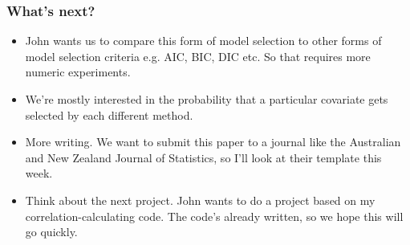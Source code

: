 \documentclass{beamer}
\begin{document}
\begin{frame}[t]\frametitle{What's next?}
	    
	\begin{itemize}
		\item John wants us to compare this form of model selection to other forms of model selection criteria e.g.
		      AIC, BIC, DIC etc. So that requires more numeric experiments.
		\item We're mostly interested in the probability that a particular covariate gets selected by each different method.
		\item More writing. We want to submit this paper to a journal like the Australian and New Zealand Journal of
		      Statistics, so I'll look at their template this week.
		\item Think about the next project. John wants to do a project based on my correlation-calculating code. The
		      code's already written, so we hope this will go quickly.
	\end{itemize}
	
\end{frame}
\end{document}

